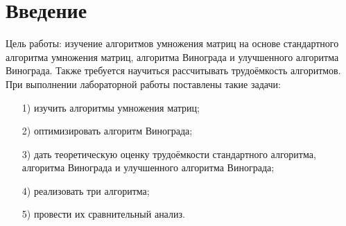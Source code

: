 \chapter*{Введение}
\label{cha:intro}
Цель работы: изучение алгоритмов умножения матриц на основе стандартного алгоритма умножения матриц, алгоритма Винограда и улучшенного алгоритма Винограда. Также требуется научиться рассчитывать трудоёмкость алгоритмов.\\
При выполнении лабораторной работы поставлены такие задачи:
\begin{enumerate}
	\item[1)] изучить алгоритмы умножения матриц;
	\item[2)] оптимизировать алгоритм Винограда;
	\item[3)] дать теоретическую оценку трудоёмкости стандартного алгоритма, алгоритма Винограда и улучшенного алгоритма Винограда;
	\item[4)] реализовать три алгоритма;
	\item[5)] провести их сравнительный анализ.
\end{enumerate}